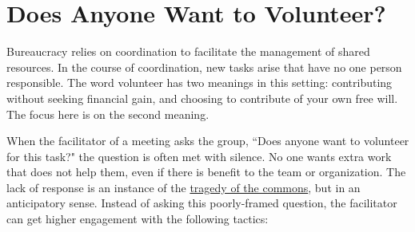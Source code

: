 \section{Does Anyone Want to Volunteer?}

Bureaucracy relies on coordination to facilitate the management of shared resources. In the course of coordination, new tasks arise that have no one person responsible. The word volunteer has two meanings in this setting: contributing without seeking financial gain, and choosing to contribute of your own free will. The focus here is on the second meaning.


When the facilitator of a meeting asks the group, ``Does anyone want to volunteer for this task?" the question is often met with silence. No one wants extra work that does not help them, even if there is benefit to the team or organization. 
The lack of response is an instance of the \href{https://en.wikipedia.org/wiki/Tragedy_of_the_commons}{tragedy of the commons}, 
but in an anticipatory sense.
Instead of asking this poorly-framed question, the facilitator can get higher engagement with the following tactics:

